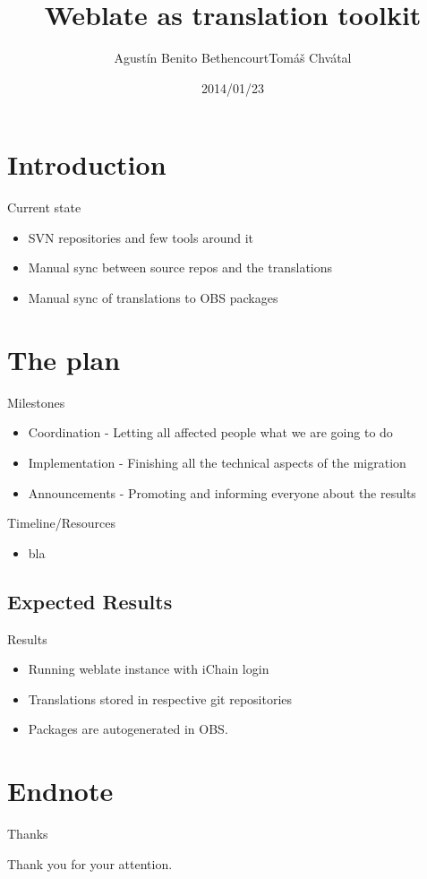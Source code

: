 \documentclass{beamer}
\author{Agust\'{i}n Benito Bethencourt\newline Tom\'{a}\v{s} Chv\'{a}tal\newline {\small openSUSE Team}}
\title{Weblate as translation toolkit}
\date{2014/01/23}
\begin{document}
\begin{frame}[t,plain]
\titlepage
\end{frame}

\section{Introduction}

\begin{frame}[t]{Current state}
	\begin{itemize}
	\item SVN repositories and few tools around it
	\item Manual sync between source repos and the translations
	\item Manual sync of translations to OBS packages
	\end{itemize}
\end{frame}

\section{The plan}

\begin{frame}[t]{Milestones}
	\begin{itemize}
	\item Coordination - Letting all affected people what we are going to do
	\item Implementation - Finishing all the technical aspects of the migration
	\item Announcements - Promoting and informing everyone about the results
	\end{itemize}
\end{frame}

\begin{frame}[t]{Timeline/Resources}
	\begin{itemize}
	\item bla
	\end{itemize}
\end{frame}

\subsection{Expected Results}

\begin{frame}[t]{Results}
	\begin{itemize}
	\item Running weblate instance with iChain login
	\item Translations stored in respective git repositories
	\item Packages are autogenerated in OBS.
	\end{itemize}
\end{frame}

\section{Endnote}

\begin{frame}{Thanks}
	\begin{center}
	Thank you for your attention.
	\end{center}
\end{frame}
\end{document}
